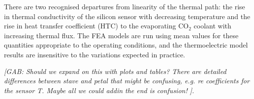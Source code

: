 
There are two recognised departures from linearity of the thermal path: the rise in thermal conductivity of the silicon sensor with decreasing temperature and the rise in heat transfer coefficient (HTC) to the evaporating CO$_2$ coolant with increasing thermal flux. The FEA models are run using mean values for these quantities appropriate to the operating conditions, and the thermoelectric model results are insensitive to the variations expected in practice.

\textit{[GAB: Should we expand on this with plots and tables? There are detailed differences between stave and petal that might be confusing, e.g. re coefficients for the sensor T.      Maybe all we could addin the end is confusion! ].}




